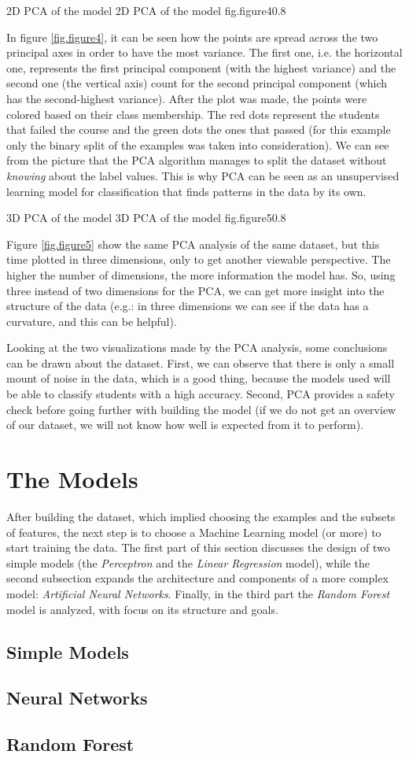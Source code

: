 %
    {2D PCA of the model}%
    {2D PCA of the model}%
    {fig.figure4}{0.8}

In figure \ref{fig.figure4}, it can be seen how the points are spread across 
the two principal axes in order to have the most variance. The first one, i.e. 
the horizontal one, represents the first principal component (with the highest 
variance) and the second one (the vertical axis) count for the second principal 
component (which has the second-highest variance). After the plot was made, 
the points were colored based on their class membership. The red dots represent 
the students that failed the course and the green dots the ones that passed 
(for this example only the binary split of the examples was taken into consideration). 
We can see from the picture that the PCA algorithm manages to split the dataset 
without {\it knowing} about the label values. This is why PCA can be seen as 
an unsupervised learning model for classification that finds patterns in the data 
by its own. 

%
    {3D PCA of the model}%
    {3D PCA of the model}%
    {fig.figure5}{0.8}

Figure \ref{fig.figure5} show the same PCA analysis of the same dataset, but 
this time plotted in three dimensions, only to get another viewable perspective.
The higher the number of dimensions, the more information the model has. So, 
using three instead of two dimensions for the PCA, we can get more insight into 
the structure of the data (e.g.: in three dimensions we can see if the data has 
a curvature, and this can be helpful).

Looking at the two visualizations made by the PCA analysis, some conclusions can 
be drawn about the dataset. First, we can observe that there is only a small 
mount of noise in the data, which is a good thing, because the models used will 
be able to classify students with a high accuracy. Second, PCA provides a 
safety check before going further with building the model (if we do not get an 
overview of our dataset, we will not know how well is expected from it to perform).

\section{The Models}

After building the dataset, which implied choosing the examples and the subsets 
of features, the next step is to choose a Machine Learning model (or more) to 
start training the data. The first part of this section discusses the design of 
two simple models (the {\it Perceptron} and the {\it Linear Regression} model), 
while the second subsection expands the architecture and components of a more 
complex model: {\it Artificial Neural Networks}. Finally, in the third part 
the {\it Random Forest} model is analyzed, with focus on its structure and goals. 

\subsection{Simple Models}

\subsection{Neural Networks}

\subsection{Random Forest}
